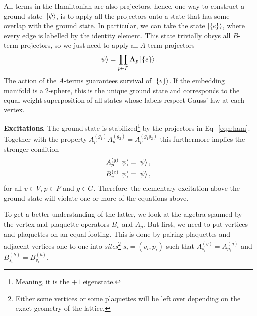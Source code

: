 \documentclass[two column]{article}
\newcommand{\caro}[1]{\textcolor{red}{[#1]}}
\begin{document}

All terms in the Hamiltonian are also projectors, hence, one way to construct a ground state, $\ket{\psi}$, is to apply all the projectors onto a state that has some overlap with the ground state. In particular, we can take the state $\ket{\{e\}}$, where every edge is labelled by the identity element.
This state trivially obeys all $B$-term projectors, so we just need to apply all $A$-term projectors
\begin{equation}
    \ket{\psi} = \prod_{p \in P} \mathbf A_p \ket{\{e\}}.
\end{equation}
The action of the $A$-terms guarantees survival of $\ket{\{e\}}$. If the embedding manifold is a 2-sphere, this is the unique ground state and corresponds to the equal weight superposition of all states whose labels respect Gauss' law at each vertex.






\textbf{Excitations.} The ground state is stabilized\footnote{Meaning, it is the $+1$ eigenstate.} by the projectors in Eq.~\eqref{eqn:ham}. Together with the property $A_p^{(g_1)}A_p^{(g_2)} = A_p^{(g_1 g_2)}$ this furthermore implies the stronger condition
\begin{equation}
\begin{split}
    A^{(g)}_p \ket{\psi} = \ket{\psi},\\
    B^{(e)}_v \ket{\psi} = \ket{\psi},
\end{split}\label{eqn:ground_state}
\end{equation}
for all $v \in V$, $p \in P$ and $g \in G$. Therefore, the elementary excitation above the ground state will violate one or more of the equations above.

To get a better understanding of the latter, we look at the algebra spanned by the vertex and plaquette operators $B_v$ and $A_p$. But first, we need to put vertices and plaquettes on an equal footing. This is done by pairing plaquettes and adjacent vertices one-to-one into \emph{sites}\footnote{Either some vertices or some plaquettes will be left over depending on the exact geometry of the lattice.} $s_i = (v_i, p_i)$ such that $A_{s_i}^{(g)} = A_{p_i}^{(g)}$ and $B_{s_i}^{(h)} = B_{v_i}^{(h)}$. 
\end{document}
